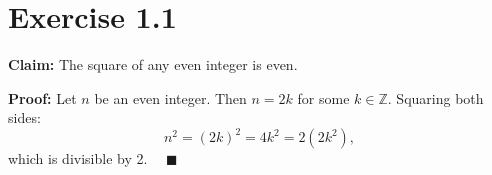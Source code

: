 \documentclass{article}
\begin{document}
\section*{Exercise 1.1}

\textbf{Claim:} The square of any even integer is even.

\textbf{Proof:} Let $n$ be an even integer. Then $n = 2k$ for some $k \in \mathbb{Z}$.  
Squaring both sides:
\[
n^2 = (2k)^2 = 4k^2 = 2(2k^2),
\]
which is divisible by 2. $\quad \blacksquare$
\end{document}
